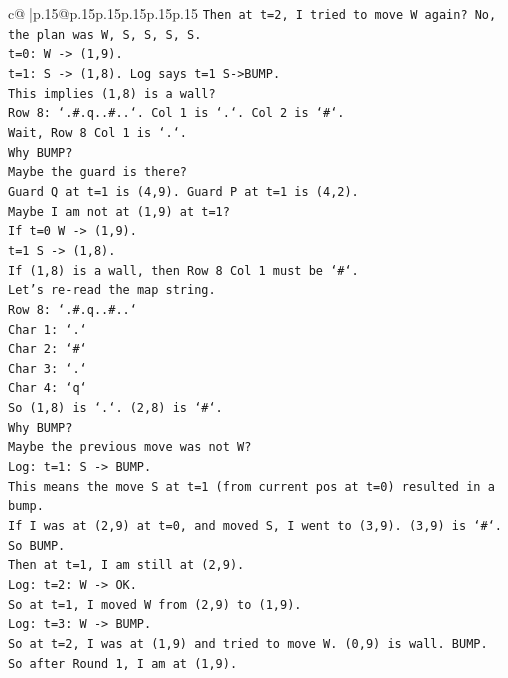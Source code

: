 \documentclass{article}
\begin{document}
{\begin{supertabular}{c@{$\;$}|p{.15\linewidth}@{}p{.15\linewidth}p{.15\linewidth}p{.15\linewidth}p{.15\linewidth}p{.15\linewidth}}
{{{\texttt{Then at t=2, I tried to move W again? No, the plan was W, S, S, S, S.} \\
\texttt{t=0: W {-}> (1,9).} \\
\texttt{t=1: S {-}> (1,8). Log says t=1 S{-}>BUMP.} \\
\texttt{This implies (1,8) is a wall?} \\
\texttt{Row 8: `.\#.q..\#..`. Col 1 is `.`. Col 2 is `\#`.} \\
\texttt{Wait, Row 8 Col 1 is `.`.} \\
\texttt{Why BUMP?} \\
\texttt{Maybe the guard is there?} \\
\texttt{Guard Q at t=1 is (4,9). Guard P at t=1 is (4,2).} \\
\texttt{Maybe I am not at (1,9) at t=1?} \\
\texttt{If t=0 W {-}> (1,9).} \\
\texttt{t=1 S {-}> (1,8).} \\
\texttt{If (1,8) is a wall, then Row 8 Col 1 must be `\#`.} \\
\texttt{Let's re{-}read the map string.} \\
\texttt{Row 8: `.\#.q..\#..`} \\
\texttt{Char 1: `.`} \\
\texttt{Char 2: `\#`} \\
\texttt{Char 3: `.`} \\
\texttt{Char 4: `q`} \\
\texttt{So (1,8) is `.`. (2,8) is `\#`.} \\
\texttt{Why BUMP?} \\
\texttt{Maybe the previous move was not W?} \\
\texttt{Log: t=1: S {-}> BUMP.} \\
\texttt{This means the move S at t=1 (from current pos at t=0) resulted in a bump.} \\
\texttt{If I was at (2,9) at t=0, and moved S, I went to (3,9). (3,9) is `\#`. So BUMP.} \\
\texttt{Then at t=1, I am still at (2,9).} \\
\texttt{Log: t=2: W {-}> OK.} \\
\texttt{So at t=1, I moved W from (2,9) to (1,9).} \\
\texttt{Log: t=3: W {-}> BUMP.} \\
\texttt{So at t=2, I was at (1,9) and tried to move W. (0,9) is wall. BUMP.} \\
\texttt{So after Round 1, I am at (1,9).} \\
}}}
\end{supertabular}}
\end{document}
